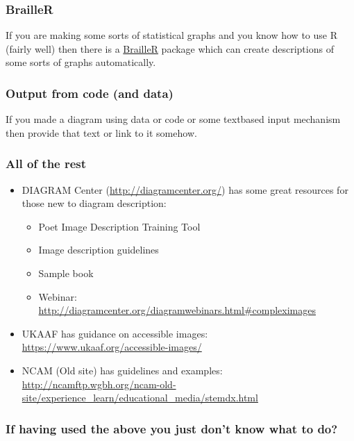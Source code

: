 \documentclass[
  10pt,
  english,
  a4paper]{article}
\providecommand{\tightlist}{%
  \setlength{\itemsep}{0pt}\setlength{\parskip}{0pt}}
\theoremstyle{plain}
\theoremstyle{plain}
\theoremstyle{plain}
\theoremstyle{plain}
\theoremstyle{plain}
\theoremstyle{definition}
\theoremstyle{definition}
\theoremstyle{definition}
\theoremstyle{remark}
\begin{document}
\hypertarget{brailler}{%
\subsubsection{BrailleR}\label{brailler}}

If you are making some sorts of statistical graphs and you know how to use R (fairly well) then there is a \href{https://github.com/ajrgodfrey/BrailleR}{BrailleR} package which can create descriptions of some sorts of graphs automatically.

\hypertarget{output-from-code-and-data}{%
\subsubsection{Output from code (and data)}\label{output-from-code-and-data}}

If you made a diagram using data or code or some textbased input mechanism then provide that text or link to it somehow.

\hypertarget{all-of-the-rest}{%
\subsubsection{All of the rest}\label{all-of-the-rest}}

\begin{itemize}
\tightlist
\item
  DIAGRAM Center (\url{http://diagramcenter.org/}) has some great resources for those new to diagram description:

  \begin{itemize}
  \tightlist
  \item
    Poet Image Description Training Tool
  \item
    Image description guidelines
  \item
    Sample book
  \item
    Webinar: \url{http://diagramcenter.org/diagramwebinars.html\#compleximages}
  \end{itemize}
\item
  UKAAF has guidance on accessible images: \url{https://www.ukaaf.org/accessible-images/}
\item
  NCAM (Old site) has guidelines and examples: \url{http://ncamftp.wgbh.org/ncam-old-site/experience_learn/educational_media/stemdx.html}
\end{itemize}

\hypertarget{if-having-used-the-above-you-just-dont-know-what-to-do}{%
\subsubsection{If having used the above you just don't know what to do?}\label{if-having-used-the-above-you-just-dont-know-what-to-do}}
\end{document}
